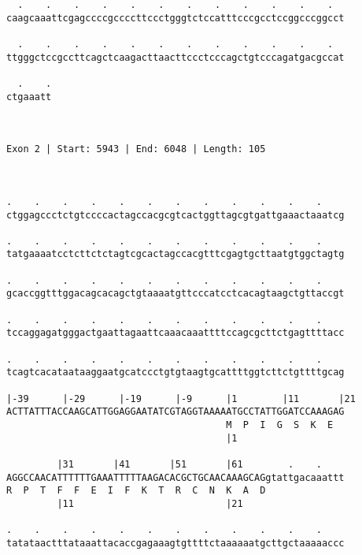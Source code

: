 \documentclass{article}
\begin{document}
\begin{Verbatim}
  .    .    .    .    .    .    .    .    .    .    .    .  
caagcaaattcgagccccgccccttccctgggtctccatttcccgcctccggcccggcct
                                                            
  .    .    .    .    .    .    .    .    .    .    .    .  
ttgggctccgccttcagctcaagacttaacttccctcccagctgtcccagatgacgccat
                                                            
  .    .
ctgaaatt
        
        
 
Exon 2 | Start: 5943 | End: 6048 | Length: 105



.    .    .    .    .    .    .    .    .    .    .    .    
ctggagccctctgtccccactagccacgcgtcactggttagcgtgattgaaactaaatcg
                                                            
.    .    .    .    .    .    .    .    .    .    .    .    
tatgaaaatcctcttctctagtcgcactagccacgtttcgagtgcttaatgtggctagtg
                                                            
.    .    .    .    .    .    .    .    .    .    .    .    
gcaccggtttggacagcacagctgtaaaatgttcccatcctcacagtaagctgttaccgt
                                                            
.    .    .    .    .    .    .    .    .    .    .    .    
tccaggagatgggactgaattagaattcaaacaaattttccagcgcttctgagttttacc
                                                            
.    .    .    .    .    .    .    .    .    .    .    .    
tcagtcacataataaggaatgcatccctgtgtaagtgcattttggtcttctgttttgcag
                                                            
|-39      |-29      |-19      |-9      |1        |11       |21
ACTTATTTACCAAGCATTGGAGGAATATCGTAGGTAAAAATGCCTATTGGATCCAAAGAG
                                       M  P  I  G  S  K  E  
                                       |1                   
  
         |31       |41       |51       |61        .    .    
AGGCCAACATTTTTTGAAATTTTTAAGACACGCTGCAACAAAGCAGgtattgacaaattt
R  P  T  F  F  E  I  F  K  T  R  C  N  K  A  D              
         |11                           |21                  
  
.    .    .    .    .    .    .    .    .    .    .    .    
tatataactttataaattacaccgagaaagtgttttctaaaaaatgcttgctaaaaaccc
                                                            

\end{Verbatim}
\end{document}
